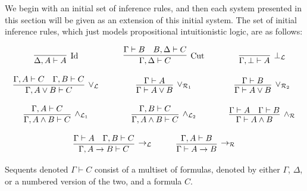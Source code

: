 \documentclass{article}
\begin{document}
We begin with an initial set of inference rules, and then each system presented in this section will be given as an extension of this initial system.  The set of initial inference rules, which just models propositional intuitionistic logic, are as follows:
\begin{center}
  \small
  \begin{math}
    \begin{array}{c}
      \begin{array}{cccccccc}
        \infer[\text{Id}]{\Delta,A \vdash A}{
          \,
        }
        & \quad &
        \infer[\text{Cut}]{\Gamma,\Delta \vdash C}{
          \Gamma \vdash B
          &
          B,\Delta \vdash C
        }
        & \quad & 
        \infer[\perp_{\mathcal{L}}]{\Gamma,\perp \; \vdash A}{
          \,
        }\\\\
        \infer[\lor_{\mathcal{L}}]{\Gamma,A \lor B \vdash C}{
          \Gamma,A \vdash C
          &
          \Gamma,B \vdash C
        }
        & \quad &
        \infer[\lor_{\mathcal{R}_1}]{\Gamma \vdash A \lor B}{
          \Gamma \vdash A
        }
        & \quad &
        \infer[\lor_{\mathcal{R}_2}]{\Gamma \vdash A \lor B}{
          \Gamma \vdash B
        }\\\\
        \infer[\land_{\mathcal{L}_1}]{\Gamma,A \land B \vdash C}{
          \Gamma,A \vdash C
        }
        & \quad &
        \infer[\land_{\mathcal{L}_2}]{\Gamma,A \land B \vdash C}{
          \Gamma,B \vdash C
        }
        & \quad &
        \infer[\land_{\mathcal{R}}]{\Gamma \vdash A \land B}{
          \Gamma \vdash A
          &
          \Gamma \vdash B
        }\\\\
        
      \end{array}
      \\
      \begin{array}{cccccccc}
        \infer[\to_{\mathcal{L}}]{\Gamma,A \to B \vdash C}{
          \Gamma \vdash A
          &
          \Gamma,B \vdash C
        }
        & \quad &
        \infer[\to_{\mathcal{R}}]{\Gamma \vdash A \to B}{
          \Gamma, A \vdash B
        }
      \end{array}        
    \end{array}
  \end{math}
\end{center}
Sequents denoted $\Gamma \vdash C$ consist of a multiset of formulas,
denoted by either $\Gamma$, $\Delta$, or a numbered version of the two, and a formula $C$.
\end{document}
